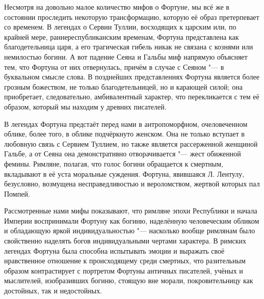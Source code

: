 Несмотря на довольно малое количество мифов о Фортуне, мы всё же в состоянии проследить некоторую трансформацию, которую её образ претерпевает со временем. В легендах о Сервии Туллии, восходящих к царским или, по крайней мере, раннереспубликанским временам, Фортуна представлена как благодетельница царя, а его трагическая гибель никак не связана с кознями или немилостью богини. А вот падение Сеяна и Гальбы миф напрямую объясняет тем, что Фортуна от них отвернулась, причём в случае с Сеяном "--- в буквальном смысле слова. В позднейших представлениях Фортуна является более грозным божеством, не только благодетельницей, но и карающей силой; она приобретает, следовательно, амбивалентный характер, что перекликается с тем её образом, который мы находим у древних писателей.

В легендах Фортуна предстаёт перед нами в антропоморфном, очеловеченном облике, более того, в облике подчёркнуто женском. Она не только вступает в любовную связь с Сервием Туллием, но также является рассерженной женщиной Гальбе, а от Сеяна она демонстративно отворачивается "--- жест обиженной фемины. Римляне, полагая, что голос богини обращается к смертным, вкладывают в её уста моральные суждения. Фортуна, явившаяся Л. Лентулу, безусловно, возмущена несправедливостью и вероломством, жертвой которых пал Помпей.

Рассмотренные нами мифы показывают, что римляне эпохи Республики и начала Империи воспринимали Фортуну как богиню, наделённую человеческим обликом и обладающую яркой индивидуальностью "--- насколько вообще римлянам было свойственно наделять богов индивидуальными чертами характера. В римских легендах Фортуна была способна испытывать эмоции и выражать своё нравственное отношение к происходящему среди смертных, что разительным образом контрастирует с портретом Фортуны античных писателей, учёных и мыслителей, изобразивших богиню, стоящую вне морали, покровительницу как достойных, так и недостойных.




